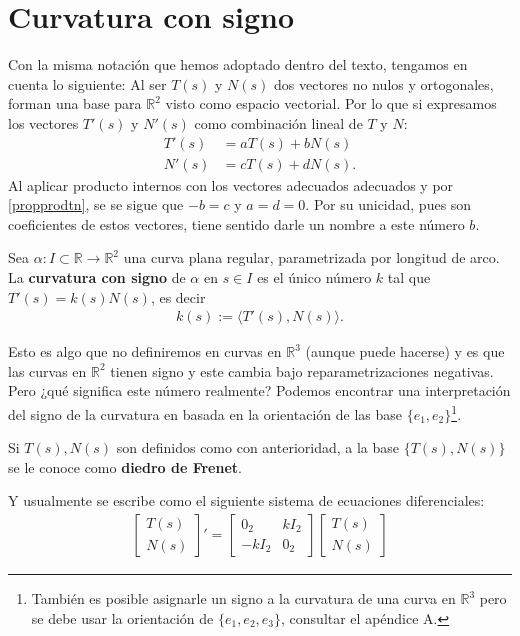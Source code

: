 \documentclass[oneside,11pt]{memoir}
\begin{document}
\section{Curvatura con signo}
Con la misma notación que hemos adoptado dentro del texto, tengamos en cuenta lo siguiente: Al ser $T(s)$ y $N(s)$ dos vectores no nulos y ortogonales, forman una base para $\mathbb{R}^2$ visto como espacio vectorial. Por lo que si expresamos los vectores $T'(s)$ y $N'(s)$ como combinación lineal de $T$ y $N$:
\begin{align*}
    T'(s)&=aT(s)+bN(s)\\
    N'(s)&=cT(s)+dN(s).
\end{align*}
Al aplicar producto internos con los vectores adecuados adecuados y por \ref{propprodtn}, se se sigue que $-b=c$ y $a=d=0$. Por su unicidad, pues son coeficientes de estos vectores, tiene sentido darle un nombre a este número $b$. 
\begin{definition}
    Sea $\alpha:I\subset \mathbb{R}\to \mathbb{R}^2$ una curva plana regular, parametrizada por longitud de arco. La \textbf{curvatura con signo} de $\alpha$ en $s\in I$ es el único número $k$ tal que $T'(s)=k(s)N(s)$, es decir 
\begin{align*}
    k(s):=\langle T'(s), N(s)\rangle.
\end{align*}
\end{definition}
Esto es algo que no definiremos en curvas en $\mathbb{R}^3$ (aunque puede hacerse) y es que las curvas en $\mathbb{R}^2$ tienen signo y este cambia bajo reparametrizaciones negativas. Pero ¿qué significa este número realmente? Podemos encontrar una interpretación del signo de la curvatura en \cite[p.~22]{do2016differential} basada en la orientación de las base $\{e_1,e_2\}$\footnote{También es posible asignarle un signo a la curvatura de una curva en $\mathbb{R}^3$ pero se debe usar la orientación de $\{e_1,e_2,e_3\}$, consultar el apéndice A.}. 
\begin{definition}
    Si  $T(s),N(s)$ son definidos como con anterioridad, a la base $\{T(s),N(s)\}$ se le conoce como \textbf{diedro de Frenet}.
\end{definition}
Y usualmente se escribe como el siguiente sistema de ecuaciones diferenciales:
\begin{align}
\begin{bmatrix}
    T(s)\\
    N(s)
\end{bmatrix}
'
=
\begin{bmatrix}
    0_2 & k I_2\\
    -k I_2 & 0_2
\end{bmatrix}
\begin{bmatrix}
    T(s)\\
    N(s)
\end{bmatrix}
\label{sistema2dfrenet}
\end{align}
\end{document}
